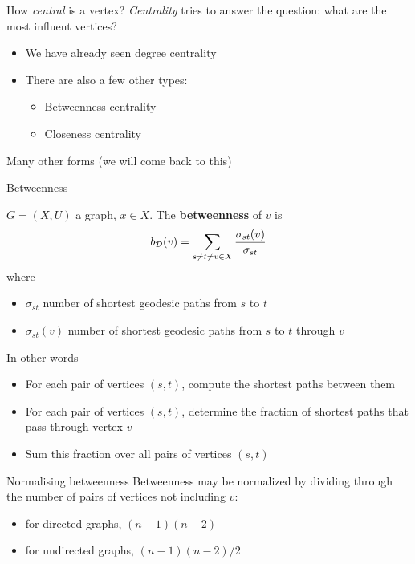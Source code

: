\documentclass[aspectratio=43]{beamer}
\begin{document}
\begin{frame}{How \emph{central} is a vertex?}
	\emph{Centrality} tries to answer the question: what are the most influent vertices?
	\vfill
	\begin{itemize}
		\item We have already seen degree centrality
		\vfill
		\item There are also a few other types:
		\vfill
		\begin{itemize}
			\item Betweenness centrality
			\vfill
			\item Closeness centrality
		\end{itemize}
	\end{itemize}
	\vfill
	Many other forms (we will come back to this)
\end{frame}

\begin{frame}{Betweenness}
\begin{definition}[Betweenness]
	$G=(X,U)$ a graph, $x\in X$. The \textbf{betweenness} of $v$ is
	\[
	b_{\mathcal{D}}(v)= \sum_{s\neq t\neq v  \in X} \frac{\sigma_{st}(v)}{\sigma_{st}}
	\]
	where
	\begin{itemize}
	\item $\sigma_{st}$ number of shortest geodesic paths from $s$ to $t$
	\item $\sigma_{st}(v)$ number of shortest geodesic paths from $s$ to $t$ through $v$
	\end{itemize}		
\end{definition}
\vfill
In other words
\begin{itemize}
	\item For each pair of vertices $(s,t)$, compute the shortest paths between them
	\item For each pair of vertices $(s,t)$, determine the fraction of shortest paths that pass through vertex $v$
	\item Sum this fraction over all pairs of vertices $(s,t)$
\end{itemize}
\end{frame}

\begin{frame}{Normalising betweenness}
	Betweenness may be normalized by dividing through the number of pairs of vertices not including $v$:
	\begin{itemize}
		\item for directed graphs, $(n-1)(n-2)$
		\item for undirected graphs, $(n-1)(n-2)/2$
	\end{itemize}
\end{frame}
\end{document}

